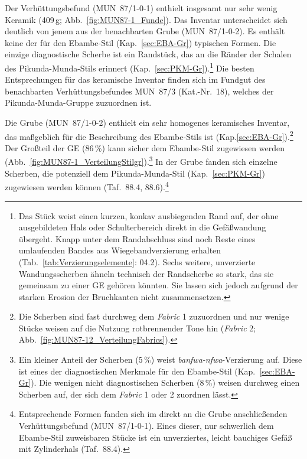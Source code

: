 Der Verhüttungsbefund (MUN~87/1-0-1) enthielt insgesamt nur sehr wenig Keramik (409\,g; Abb.~\ref{fig:MUN87-1_Funde}). Das Inventar unterscheidet sich deutlich von jenem aus der benachbarten Grube (MUN~87/1-0-2). Es enthält keine der für den Ebambe-Stil (Kap.~\ref{sec:EBA-Gr}) typischen Formen. Die einzige diagnostische Scherbe ist ein Randstück, das an die Ränder der Schalen des Pikunda-Munda-Stils erinnert (Kap.~\ref{sec:PKM-Gr}).\footnote{Das Stück weist einen kurzen, konkav ausbiegenden Rand auf, der ohne ausgebildeten Hals oder Schulterbereich direkt in die Gefäßwandung übergeht. Knapp unter dem Randabschluss sind noch Reste eines umlaufenden Bandes aus Wiegebandverzierung erhalten (Tab.~\ref{tab:Verzierungselemente}: 04.2). Sechs weitere, unverzierte Wandungsscherben ähneln technisch der Randscherbe so stark, das sie gemeinsam zu einer GE gehören könnten. Sie lassen sich jedoch aufgrund der starken Erosion der Bruchkanten nicht zusammensetzen.} Die besten Entsprechungen für das keramische Inventar finden sich im Fundgut des benachbarten Verhüttungsbefundes MUN~87/3 (Kat.-Nr.~18), welches der Pikunda-Munda-Gruppe zuzuordnen ist. 

Die Grube (MUN~87/1-0-2) enthielt ein sehr homogenes keramisches Inventar, das maßgeblich für die Beschreibung des Ebambe-Stils ist (Kap.\ref{sec:EBA-Gr}).\footnote{Die Scherben sind fast durchweg dem \textit{Fabric} 1 zuzuordnen und nur wenige Stücke weisen auf die Nutzung rotbrennender Tone hin (\textit{Fabric} 2; Abb.~\ref{fig:MUN87-12_VerteilungFabrics}).} Der Großteil der GE (86\,\%) kann sicher dem Ebambe-Stil zugewiesen werden (Abb.~\ref{fig:MUN87-1_VerteilungStilgr}).\footnote{Ein kleiner Anteil der Scherben (5\,\%) weist \textit{banfwa-nfwa}-Verzierung auf. Diese ist eines der diagnostischen Merkmale für den Ebambe-Stil (Kap.~\ref{sec:EBA-Gr}). Die wenigen nicht diagnostischen Scherben (8\,\%) weisen durchweg einen Scherben auf, der sich dem \textit{Fabric} 1 oder 2 zuordnen lässt.} In der Grube fanden sich einzelne Scherben, die potenziell dem Pikunda-Munda-Stil (Kap.~\ref{sec:PKM-Gr}) zugewiesen werden können (Taf.~88.4, 88.6).\footnote{Entsprechende Formen fanden sich im direkt an die Grube anschließenden Verhüttungsbefund (MUN~87/1-0-1). Eines dieser, nur schwerlich dem Ebambe-Stil zuweisbaren Stücke ist ein unverziertes, leicht bauchiges Gefäß mit Zylinderhals (Taf.~88.4).}


